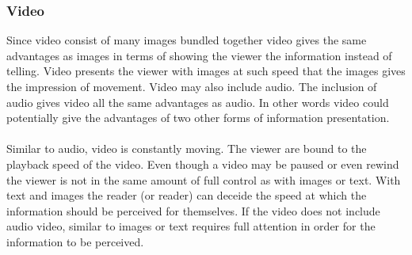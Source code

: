 \subsubsection{Video}
Since video consist of many images bundled together video gives the same advantages as images in terms of showing the viewer the information instead of telling. Video presents the viewer with images at such speed that the images gives the impression of movement. Video may also include audio. The inclusion of audio gives video all the same advantages as audio. In other words video could potentially give the advantages of two other forms of information presentation.
\\
\\
Similar to audio, video is constantly moving. The viewer are bound to the playback speed of the video. Even though a video may be paused or even rewind the viewer is not in the same amount of full control as with images or text. With text and images the reader (or reader) can deceide the speed at which the information should be perceived for themselves. If the video does not include audio video, similar to images or text requires full attention in order for the information to be perceived.